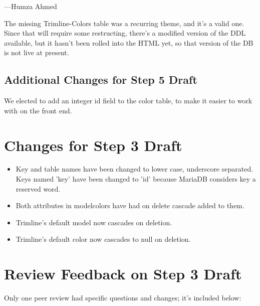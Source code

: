 \documentclass[11pt,letterpaper,oneside]{amsart}
\begin{document}
---Humza Ahmed

The missing Trimline-Colors table was a recurring theme, and it's a valid one.  Since that will require some restructing, there's a modified version of the DDL available, but it hasn't been rolled into the HTML yet, so that version of the DB is not live at present.

\subsection*{Additional Changes for Step 5 Draft}

We elected to add an integer id field to the color table, to make it easier to work with on the front end.

\section*{Changes for Step 3 Draft}

\begin{itemize}

\item Key and table names have been changed to lower case, underscore separated.  Keys named 'key' have been changed to 'id' because MariaDB considers key a reserved word.

\item Both attributes in model{\textunderscore}colors have had on delete cascade added to them.

\item Trimline's default model now cascades on deletion.

\item Trimline's default color now cascades to null on deletion.

\end{itemize}

\section*{Review Feedback on Step 3 Draft}

Only one peer review had specific questions and changes; it's included below:
\end{document}
